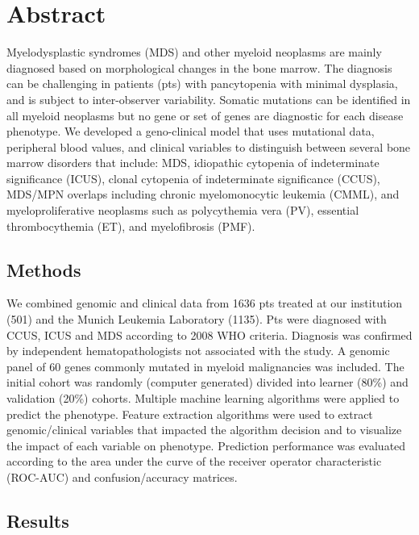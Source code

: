 \section{Abstract}%

Myelodysplastic syndromes (MDS) and other myeloid neoplasms are mainly diagnosed based on morphological changes in the bone marrow. The diagnosis can be challenging in patients (pts) with pancytopenia with minimal dysplasia, and is subject to inter-observer variability. Somatic mutations can be identified in all myeloid neoplasms but no gene or set of genes are diagnostic for each disease phenotype. 
We developed a geno-clinical model that uses mutational data, peripheral blood values, and clinical variables to distinguish between several bone marrow disorders that include: MDS, idiopathic cytopenia of indeterminate significance (ICUS), clonal cytopenia of indeterminate significance (CCUS), MDS/MPN overlaps including chronic myelomonocytic leukemia (CMML), and myeloproliferative neoplasms such as polycythemia vera (PV), essential thrombocythemia (ET), and myelofibrosis (PMF).


\subsection{Methods}%

We combined genomic and clinical data from 1636 pts treated at our institution (501) and the Munich Leukemia Laboratory (1135). Pts were diagnosed with CCUS, ICUS and MDS according to 2008 WHO criteria. Diagnosis was confirmed by independent hematopathologists not associated with the study. A genomic panel of 60 genes commonly mutated in myeloid malignancies was included. The initial cohort was randomly (computer generated) divided into learner (80\%) and validation (20\%) cohorts. Multiple machine learning algorithms were applied to predict the phenotype. Feature extraction algorithms were used to extract genomic/clinical variables that impacted the algorithm decision and to visualize the impact of each variable on phenotype. Prediction performance was evaluated according to the area under the curve of the receiver operator characteristic (ROC-AUC) and confusion/accuracy matrices.


\subsection{Results}%

